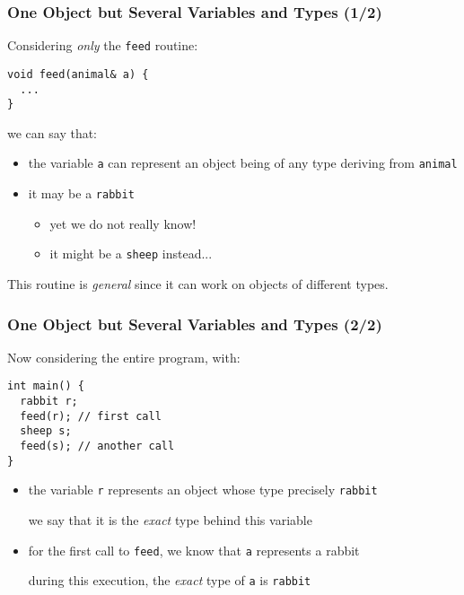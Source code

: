 \documentclass{beamer}
\newcommand{\code}[1]{{\scriptsize{\texttt{#1}}}\xspace}
\begin{document}
\begin{frame}[fragile]
  \frametitle{One Object but Several Variables and Types (1/2)}

Considering \emph{only} the \code{feed} routine:
\begin{lstlisting}
void feed(animal& a) {
  ...
}
\end{lstlisting}

\smallskip

we can say that:
\begin{itemize}
\item the variable \code{a} can represent an object being of any type
  deriving from \code{animal}
\item it may be a \code{rabbit}
  \begin{itemize}
  \item yet we do not really know!
  \item it might be a \code{sheep} instead...
  \end{itemize}
\end{itemize}

\smallskip

\begin{center}
  This routine is \emph{general} since it can work on objects of
  different types.
\end{center}

\end{frame}



\begin{frame}[fragile]
  \frametitle{One Object but Several Variables and Types (2/2)}

Now considering the entire program, with:
\begin{lstlisting}
int main() {
  rabbit r;
  feed(r); // first call
  sheep s;
  feed(s); // another call
}
\end{lstlisting}

\begin{itemize}
\item the variable \code{r} represents an object whose type
  precisely \code{rabbit}
  \begin{center}
    we say that it is the \emph{exact} type behind this variable
  \end{center}
\item for the first call to \code{feed}, we know that \code{a} represents a rabbit
  \begin{center}
    during this execution, the \emph{exact} type of \code{a} is \code{rabbit}
  \end{center}
\end{itemize}

\end{frame}
\end{document}
